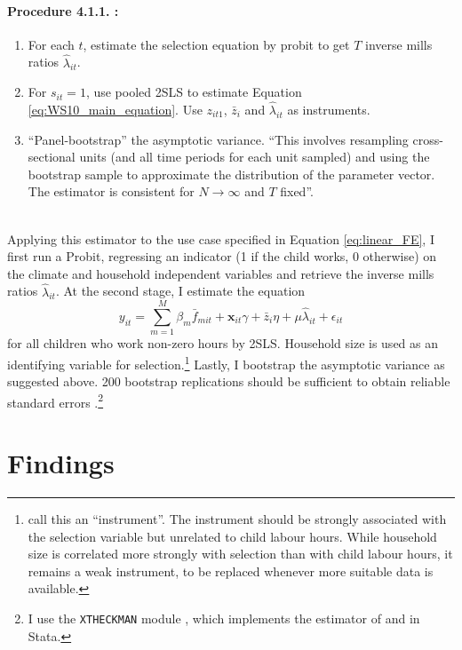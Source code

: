 \documentclass[a4paper,12pt]{article}
\theoremstyle{plain}
\theoremstyle{definition}
\theoremstyle{definition}
\theoremstyle{definition}
\theoremstyle{definition}
\begin{document}
\paragraph{Procedure 4.1.1. \citep[][]{semykina2010}:}
\begin{enumerate}
    \item For each $t$, estimate the selection equation by probit to get $T$ inverse mills ratios $\hat{\lambda}_{it}$.
    \item For $s_{it}=1$, use pooled 2SLS to estimate Equation \ref{eq:WS10_main_equation}. Use $z_{it1}$, $\bar{z}_i$ and $\hat{\lambda}_{it}$ as instruments.
    \item ``Panel-bootstrap'' the asymptotic variance. ``This involves resampling cross-sectional units (and all time periods for each unit sampled) and using the bootstrap sample to approximate the distribution of the parameter vector. The estimator is consistent for $N\rightarrow \infty$ and $T$ fixed''\citep[][p. 378]{semykina2010}.
\end{enumerate}
\hfill\qedsymbol\\
Applying this estimator to the use case specified in Equation \ref{eq:linear_FE}, I first run a Probit, regressing an indicator (1 if the child works, 0 otherwise) on the climate and household independent variables and retrieve the inverse mills ratios $\hat{\lambda}_{it}$. At the second stage, I estimate the equation
\begin{equation}
    y_{it}= \sum_{m=1}^M \beta_m \bar{f}_{mit} + \mathbf{x}_{it}\gamma + \bar{z}_i\eta + \mu \hat{\lambda}_{it} + \epsilon_{it}
\end{equation}
for all children who work non-zero hours by 2SLS. Household size is used as an identifying variable for selection.\footnote{\citet{semykina2010} call this an ``instrument''. The instrument should be strongly associated with the selection variable but unrelated to child labour hours. While household size is correlated more strongly with selection than with child labour hours, it remains a weak instrument, to be replaced whenever more suitable data is available.} Lastly, I bootstrap the asymptotic variance as suggested above. 200 bootstrap replications should be sufficient to obtain reliable standard errors \citep[][p. 47]{efron1994}.\footnote{I use the \texttt{XTHECKMAN} module \citep{rios-avila2021}, which implements the estimator of \citet{wooldridge1995} and \citet{semykina2010} in Stata.}

\section{Findings}
\label{sec:findings}
\end{document}
